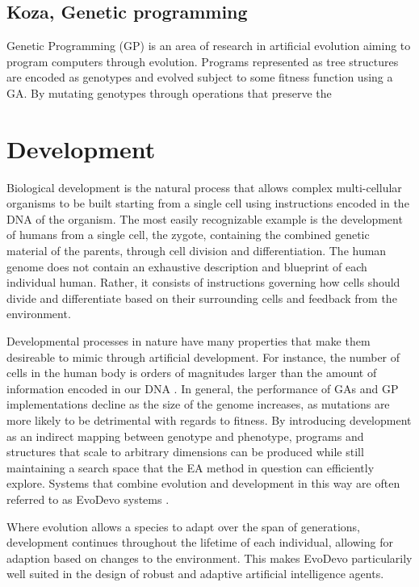 \subsection{Koza, Genetic programming}

Genetic Programming (GP) is an area of research in artificial evolution aiming
to program computers through evolution. Programs represented as tree structures
are encoded as genotypes and evolved subject to some fitness function using a
GA. By mutating genotypes through operations that preserve the 

\section{Development}

Biological development is the natural process that allows complex multi-cellular
organisms to be built starting from a single cell using instructions encoded in
the DNA of the organism. The most easily recognizable example is the development
of humans from a single cell, the zygote, containing the combined genetic
material of the parents, through cell division and differentiation. The human
genome does not contain an exhaustive description and blueprint of each
individual human. Rather, it consists of instructions governing how cells should
divide and differentiate based on their surrounding cells and feedback from the
environment.

Developmental processes in nature have many properties that make them desireable
to mimic through artificial development. For instance, the number of cells in
the human body is orders of magnitudes larger than the amount of information
encoded in our DNA \cite{Bianconi2013}. In general, the performance of GAs and
GP implementations decline as the size of the genome increases, as mutations are
more likely to be detrimental with regards to fitness. By introducing
development as an indirect mapping between genotype and phenotype, programs and
structures that scale to arbitrary dimensions can be produced while still
maintaining a search space that the EA method in question can efficiently
explore. Systems that combine evolution and development in this way are often
referred to as EvoDevo systems \cite{Hall2003}.

Where evolution allows a species to adapt over the span of generations,
development continues throughout the lifetime of each individual, allowing for
adaption based on changes to the environment. This makes EvoDevo particularily
well suited in the design of robust and adaptive artificial intelligence agents.

